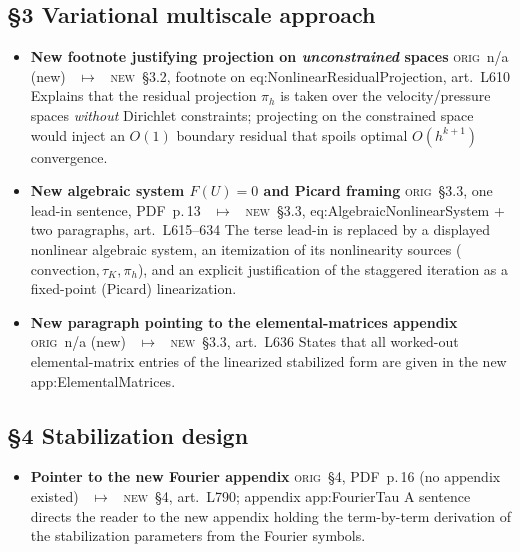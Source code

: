 \documentclass[11pt]{article}
\newcommand{\Orig}{\textcolor{origc}{\footnotesize\textsc{orig}}}
\newcommand{\New}{\textcolor{newc}{\footnotesize\textsc{new}}}
\newcommand{\code}[1]{\textcolor{newc}{\ttfamily\small #1}}
\newcommand{\pdfp}[1]{PDF~p.\,#1}
\newcommand{\artl}[1]{art.\ L#1}       %
\newcommand{\ch}[4]{%
  \item \textbf{#1}\newline
    {\footnotesize\Orig\ #2 \ \textcolor{locc}{$\longmapsto$} \ \New\ #3}\newline
    #4}
\begin{document}
\subsection{\S3 Variational multiscale approach}
\begin{itemize}
\ch{New footnote justifying projection on \emph{unconstrained} spaces}
   {n/a (new)}
   {\S3.2, footnote on \code{eq:NonlinearResidualProjection}, \artl{610}}
   {Explains that the residual projection $\pi_h$ is taken over the velocity/pressure spaces
    \emph{without} Dirichlet constraints; projecting on the constrained space would inject an
    $O(1)$ boundary residual that spoils optimal $O(h^{k+1})$ convergence.}
\ch{New algebraic system $F(U)=0$ and Picard framing}
   {\S3.3, one lead-in sentence, \pdfp{13}}
   {\S3.3, \code{eq:AlgebraicNonlinearSystem} + two paragraphs, \artl{615}--634}
   {The terse lead-in is replaced by a displayed nonlinear algebraic system, an itemization of
    its nonlinearity sources ($\text{convection},\tau_K,\pi_h$), and an explicit justification of
    the staggered iteration as a fixed-point (Picard) linearization.}
\ch{New paragraph pointing to the elemental-matrices appendix}
   {n/a (new)}
   {\S3.3, \artl{636}}
   {States that all worked-out elemental-matrix entries of the linearized stabilized form are
    given in the new \code{app:ElementalMatrices}.}
\end{itemize}

\subsection{\S4 Stabilization design}
\begin{itemize}
\ch{Pointer to the new Fourier appendix}
   {\S4, \pdfp{16} (no appendix existed)}
   {\S4, \artl{790}; appendix \code{app:FourierTau}}
   {A sentence directs the reader to the new appendix holding the term-by-term derivation of the
    stabilization parameters from the Fourier symbols.}
\end{itemize}
\end{document}
